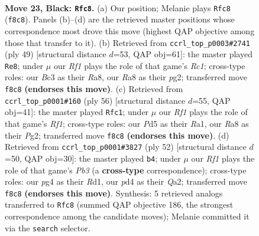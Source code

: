 \documentclass[11pt]{article}
\begin{document}
\clearpage

\begin{figure}[p]\centering
\begin{subfigure}{0.46\textwidth}\centering
\resizebox{\linewidth}{!}{%
\newchessgame
\chessboard[
  setfen={r4rk1/p4p1p/4p3/pq1p2P1/3P1QPP/2b5/2P5/3K2RR b - - 0 23},
  showmover=false,
  pgfstyle=straightmove, color=movearrow, markmove={f8-c8}
]}
\caption{}
\end{subfigure}\hfill
\begin{subfigure}{0.46\textwidth}\centering
\resizebox{\linewidth}{!}{%
\newchessgame
\chessboard[
  setfen={r1r3k1/pp2qp1p/2p3p1/8/2QPP3/P7/1P4PP/3RR1K1 b - - 0 25},
  showmover=false,
  pgfstyle=straightmove, color=movearrow, markmove={c8-e8}
]}
\caption{}
\end{subfigure}
\\[4pt]
\begin{subfigure}{0.46\textwidth}\centering
\resizebox{\linewidth}{!}{%
\newchessgame
\chessboard[
  setfen={r6k/3q2p1/r4p1p/1p2pP2/8/PQ1P3P/5PP1/R4RK1 w - - 0 29},
  showmover=false,
  pgfstyle=straightmove, color=movearrow, markmove={f1-c1}
]}
\caption{}
\end{subfigure}\hfill
\begin{subfigure}{0.46\textwidth}\centering
\resizebox{\linewidth}{!}{%
\newchessgame
\chessboard[
  setfen={3r2k1/2q2p2/p1r3p1/1p1p3p/8/PP2P2P/Q2R1PP1/3R2K1 w - - 5 27},
  showmover=false,
  pgfstyle=straightmove, color=movearrow, markmove={b3-b4}
]}
\caption{}
\end{subfigure}
\caption{\textbf{Move 23, Black: \texttt{Rfc8}.} (a) Our position; Melanie plays \texttt{Rfc8} (\texttt{f8c8}). Panels (b)--(d) are the retrieved master positions whose correspondence most drove this move (highest QAP objective among those that transfer to it). (b) Retrieved from \texttt{ccrl\_top\_p0003\#2741} (ply 49) [structural distance $d$=53, QAP obj=61]: the master played \texttt{Re8}; under $\mu$ our \emph{Rf1} plays the role of that game's \emph{Rc1}; cross-type roles: our \emph{B}c3 as their \emph{R}a8, our \emph{R}a8 as their \emph{p}g2; transferred move \texttt{f8c8} \textbf{(endorses this move)}. (c) Retrieved from \texttt{ccrl\_top\_p0001\#160} (ply 56) [structural distance $d$=55, QAP obj=41]: the master played \texttt{Rfc1}; under $\mu$ our \emph{Rf1} plays the role of that game's \emph{Rf1}; cross-type roles: our \emph{P}d5 as their \emph{R}a1, our \emph{R}a8 as their \emph{P}g2; transferred move \texttt{f8c8} \textbf{(endorses this move)}. (d) Retrieved from \texttt{ccrl\_top\_p0001\#3827} (ply 52) [structural distance $d$=50, QAP obj=30]: the master played \texttt{b4}; under $\mu$ our \emph{Rf1} plays the role of that game's \emph{Pb3} (a \textbf{cross-type} correspondence); cross-type roles: our \emph{p}g4 as their \emph{R}d1, our \emph{p}d4 as their \emph{Q}a2; transferred move \texttt{f8c8} \textbf{(endorses this move)}. Synthesis: 5 retrieved analogs transferred to \texttt{Rfc8} (summed QAP objective 186, the strongest correspondence among the candidate moves); Melanie committed it via the \texttt{search} selector.}
\label{fig:thought-m45}
\end{figure}
\end{document}
